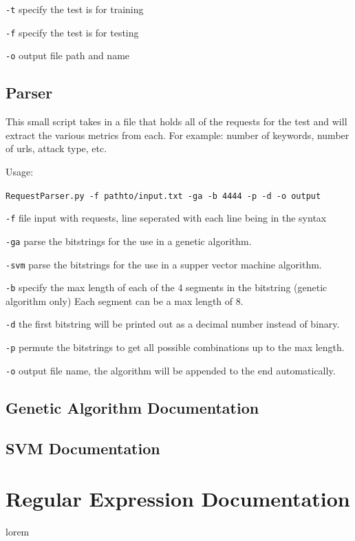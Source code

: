 \begin{appendices}
\texttt{-t} specify the test is for training

\texttt{-f} specify the test is for testing

\texttt{-o} output file path and name

\section{Parser}  \label{app:parserDocumentation}

This small script takes in a file that holds all of the requests for the
test and will extract the various metrics from each. For example: number
of keywords, number of urls, attack type, etc.

Usage:

\texttt{RequestParser.py\ -f\ pathto/input.txt\ -ga\ -b\ 4444\ -p\ -d\ -o\ output}

\texttt{-f} file input with requests, line seperated with each line
being in the syntax

\texttt{-ga} parse the bitstrings for the use in a genetic algorithm.

\texttt{-svm} parse the bitstrings for the use in a supper vector
machine algorithm.

\texttt{-b} specify the max length of each of the 4 segments in the
bitstring (genetic algorithm only) Each segment can be a max length of
8.

\texttt{-d} the first bitstring will be printed out as a decimal number
instead of binary.

\texttt{-p} permute the bitstrings to get all possible combinations up
to the max length.

\texttt{-o} output file name, the algorithm will be appended to the end
automatically.

\section{Genetic Algorithm Documentation} \label{app:geneticDocumentation}
\section{SVM Documentation} \label{app:svmDocumentation}

\chapter{Regular Expression Documentation} \label{app:regex}
lorem


\end{appendices}
